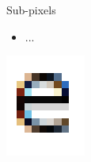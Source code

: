 \documentclass{lug}
\newcommand{\splitslide}[4]{
    \noindent
    \begin{minipage}{#1 \textwidth - #2 }
        #3
    \end{minipage}%
    \hspace{ \dimexpr #2 * 2 \relax }%
    \begin{minipage}{\textwidth - #1 \textwidth - #2 }
        #4
    \end{minipage}
}
\begin{document}
\begin{frame}{Sub-pixels}
    \splitslide{0.65}{.7em}{
        \small
        \begin{itemize}
            \item ...
        \end{itemize}
    }{
        \includegraphics[width=\textwidth]{graphics/subpixel_e}
    }
\end{frame}
\end{document}
